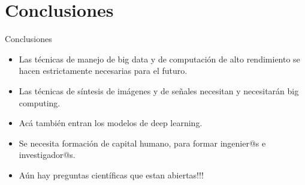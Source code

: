 \documentclass[xetex,aspectratio=169]{beamer}
\begin{document}
	\section{Conclusiones}
	\begin{frame}{Conclusiones}
		\begin{itemize}
			\item Las técnicas de manejo de big data y de computación de alto rendimiento se hacen estrictamente necesarias para el futuro.
			\item Las técnicas de síntesis de imágenes y de señales necesitan y necesitarán big computing.
			\item Acá también entran los modelos de deep learning.
			\item Se necesita formación de capital humano, para formar ingenier@s e investigador@s.
			\item Aún hay preguntas científicas que estan abiertas!!!
		\end{itemize}
	\end{frame}
\end{document}
